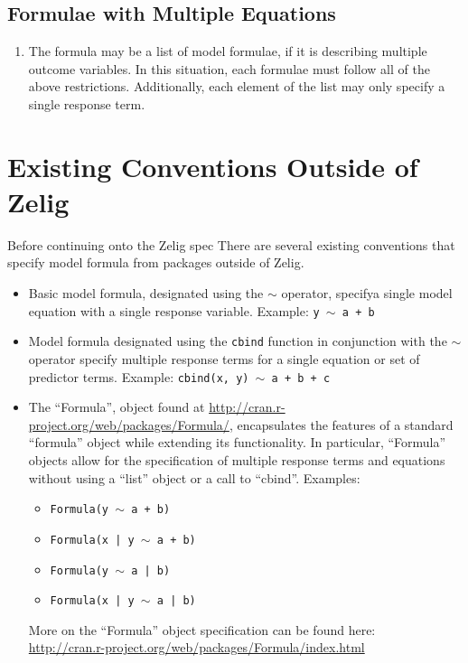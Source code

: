 \documentclass{article}
\newcommand{\tweedly}[0]{$\sim${ }}
\begin{document}
\subsection{Formulae with Multiple Equations}

\begin{enumerate}

  \item The formula may be a list of model formulae, if it is describing
    multiple outcome variables. In this situation, each formulae must follow
    all of the above restrictions. Additionally, each element of the list may
    only specify a single response term.

\end{enumerate}



%
%
%
\section{Existing Conventions Outside of Zelig}
\label{sec:existing-elsewhere}

Before continuing onto the Zelig spec
There are several existing conventions that specify model formula from packages
outside of Zelig.

\begin{itemize}

  \item Basic model formula, designated using the \tweedly operator, specifya single
    model equation with a single response variable. Example: 
    {\tt y \tweedly a + b}

  \item Model formula designated using the \verb+cbind+ function in conjunction
    with the \tweedly operator specify multiple response terms for a single
    equation or set of predictor terms. Example: 
    {\tt cbind(x, y) \tweedly a + b + c}

  \item The ``Formula'', object found at
    \url{http://cran.r-project.org/web/packages/Formula/}, encapsulates the
    features of a standard ``formula'' object while extending its functionality.
    In particular, ``Formula'' objects allow for the specification of multiple
    response terms and equations without using a ``list'' object or a call to
    ``cbind''. Examples:
    \begin{itemize}
      \item {\tt Formula(y \tweedly a + b)}
      \item {\tt Formula(x | y \tweedly a + b)}
      \item {\tt Formula(y \tweedly a | b)}
      \item {\tt Formula(x | y \tweedly a | b)}
   \end{itemize}

   More on the ``Formula'' object specification can be found here:\\
   \url{http://cran.r-project.org/web/packages/Formula/index.html}

\end{itemize}
\end{document}
